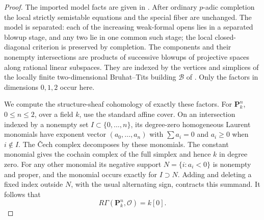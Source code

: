 \begin{proof}
The imported model facts are given in
\cite[Sections~3.6,~3.8,~6.1--6.2,~6.4 and~7.1, and the proof of Proposition~6.5]{GKModel}.
After ordinary $p$-adic completion the local strictly semistable
equations and the special fiber are unchanged.  The model is separated:
each of the increasing weak-formal opens lies in a separated blowup
stage, and any two lie in one common such stage; the local closed-diagonal
criterion is preserved by completion.  The components and their
nonempty intersections are products of successive blowups of
projective spaces along rational linear subspaces.  They are indexed
by the vertices and simplices of the locally finite two-dimensional
Bruhat--Tits building $\mathcal B$ of .  Only the factors in dimensions
$0,1,2$ occur here.

We compute the structure-sheaf cohomology of exactly these factors.
For $\mathbf P^n_k$, $0\leq n\leq2$, over a field $k$, use the standard
affine cover.  On an intersection indexed by a nonempty set
$I\subset\{0,\ldots,n\}$, its degree-zero homogeneous Laurent
monomials have exponent vector $(a_0,\ldots,a_n)$ with
$\sum a_i=0$ and $a_i\geq0$ when $i\notin I$.  The Čech complex
decomposes by these monomials.  The constant monomial gives the
cochain complex of the full simplex and hence $k$ in degree zero.
For any other monomial its negative support
$N=\{i:a_i<0\}$ is nonempty and proper, and the monomial occurs
exactly for $I\supset N$.  Adding and deleting a fixed index outside
$N$, with the usual alternating sign, contracts this summand.
It follows that
\[
 R\Gamma(\mathbf P^n_k,\mathcal O)=k[0].
\]


\end{proof}

